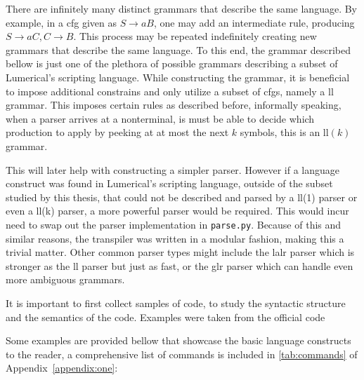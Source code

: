 There are infinitely many distinct grammars that describe the same language. By example, in a \gls{cfg} given as $S \rightarrow aB$, one may add an intermediate rule, producing $S \rightarrow aC, C \rightarrow B$. This process may be repeated indefinitely creating new grammars that describe the same language. To this end, the grammar described bellow is just one of the plethora of possible grammars describing a subset of Lumerical's scripting language. While constructing the grammar, it is beneficial to impose additional constrains and only utilize a subset of \glspl{cfg}, namely a \gls{ll} grammar. This imposes certain rules as described before, informally speaking, when a parser arrives at a nonterminal, is must be able to decide which production to apply by peeking at at most the next $k$ symbols, this is an \gls{ll}$(k)$ grammar.

This will later help with constructing a simpler parser. However if a language construct was found in Lumerical's scripting language, outside of the subset studied by this thesis, that could not be described and parsed by a \gls{ll}(1) parser or even a \gls{ll}(k) parser, a more powerful parser would be required. This would incur need to swap out the parser implementation in \texttt{parse.py}. Because of this and similar reasons, the transpiler was written in a modular fashion, making this a trivial matter. Other common parser types might include the \gls{lalr} parser which is stronger as the \gls{ll} parser but just as fast, or the \gls{glr} parser which can handle even more ambiguous grammars.


It is important to first collect samples of code, to study the syntactic structure and the semantics of the code. Examples were taken from the official code 

Some examples are provided bellow that showcase the basic language constructs to the reader, a comprehensive list of commands is included in \cref{tab:commands} of Appendix~\ref{appendix:one}:

